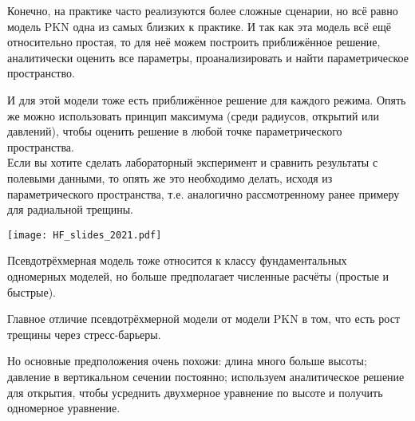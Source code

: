 \documentclass[main.tex]{subfiles}
\begin{document}
Конечно, на практике часто реализуются более сложные сценарии, но всё равно модель PKN одна из самых близких к практике.
И так как эта модель всё ещё относительно простая, то для неё можем построить приближённое решение, аналитически оценить все параметры, проанализировать и найти параметрическое пространство.

И для этой модели тоже есть приближённое решение для каждого режима.
Опять же можно использовать принцип максимума (среди радиусов, открытий или давлений), чтобы оценить решение в любой точке параметрического пространства.
\\

Если вы хотите сделать лабораторный эксперимент и сравнить результаты с полевыми данными, то опять же это необходимо делать, исходя из параметрического пространства, т.е. аналогично рассмотренному ранее примеру для радиальной трещины. 

\texttt{[image: HF\_slides\_2021.pdf]}

Псевдотрёхмерная модель тоже относится к классу фундаментальных одномерных моделей, но больше предполагает численные расчёты (простые и быстрые).

Главное отличие псевдотрёхмерной модели от модели PKN в том, что есть рост трещины через стресс-барьеры.

Но основные предположения очень похожи: длина много больше высоты; давление в вертикальном сечении постоянно; используем аналитическое решение для открытия, чтобы усреднить двухмерное уравнение по высоте и получить одномерное уравнение.
\end{document}
